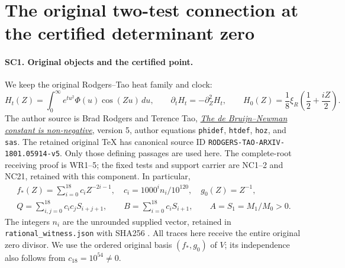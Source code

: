 \section{The original two-test connection at the certified determinant zero}
\label{sec:schur-connection-support}

\paragraph{SC1. Original objects and the certified point.}
We keep the original Rodgers--Tao heat family and clock:
\[
 H_t(Z)=\int_0^\infty e^{tu^2}\Phi(u)\cos(Zu)\,du,\qquad
 \partial_tH_t=-\partial_Z^2H_t,\qquad
 H_0(Z)=\frac18\xi_R\!\left(\frac12+\frac{iZ}{2}\right).
 \tag{SC1}
\]
The author source is Brad Rodgers and Terence Tao,
\href{https://arxiv.org/abs/1801.05914v5}{\emph{The de Bruijn--Newman
constant is non-negative}}, version 5, author equations
\texttt{phidef}, \texttt{htdef}, \texttt{hoz}, and \texttt{sas}.
The retained original TeX has canonical source ID
\texttt{RODGERS-TAO-ARXIV-1801.05914-v5}.
Only those defining passages are used here. The complete-root
receiving proof is WR1--5; the fixed tests and support carrier are
NC1--2 and NC21, retained with this component. In particular,
\[
 \begin{gathered}
 f_*(Z)=\sum_{i=0}^{18}c_iZ^{-2i-1},\quad
 c_i=1000^i n_i/10^{120},\quad g_0(Z)=Z^{-1},\\
 Q=\sum_{i,j=0}^{18}c_ic_jS_{i+j+1},\qquad
 B=\sum_{i=0}^{18}c_iS_{i+1},\qquad A=S_1=M_1/M_0>0 .
 \end{gathered}\tag{SC2}
\]
The integers \(n_i\) are the unrounded supplied vector, retained in
\texttt{rational\_witness.json} with SHA256
.
All traces here receive the entire original zero divisor. We use
the ordered original basis \((f_*,g_0)\) of \(V\); its independence
also follows from \(c_{18}=10^{54}\ne0\).

